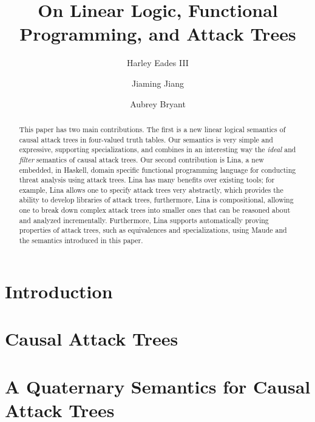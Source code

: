\documentclass{llncs}
\date{}
\begin{document}
\title{On Linear Logic, Functional Programming, and Attack Trees}

\author{Harley Eades III \and Jiaming Jiang \and Aubrey Bryant}


\maketitle

\begin{abstract}
  This paper has two main contributions. The first is a new linear
  logical semantics of causal attack trees in four-valued truth
  tables.  Our semantics is very simple and expressive, supporting
  specializations, and combines in an interesting way the \emph{ideal}
  and \emph{filter} semantics of causal attack trees. Our second
  contribution is Lina, a new embedded, in Haskell, domain specific
  functional programming language for conducting threat analysis using
  attack trees.  Lina has many benefits over existing tools; for
  example, Lina allows one to specify attack trees very abstractly,
  which provides the ability to develop libraries of attack trees,
  furthermore, Lina is compositional, allowing one to break down
  complex attack trees into smaller ones that can be reasoned about
  and analyzed incrementally.  Furthermore, Lina supports
  automatically proving properties of attack trees, such as
  equivalences and specializations, using Maude and the semantics
  introduced in this paper.
\end{abstract}

\section{Introduction}
\label{sec:introduction}


\vspace{-7px}
\section{Causal Attack Trees}
\label{sec:causal_attack_trees}


\vspace{-7px}
\section{A Quaternary Semantics for Causal Attack Trees}
\label{sec:a_quaternary_semantics_for_causal_attack_trees}

\end{document}
